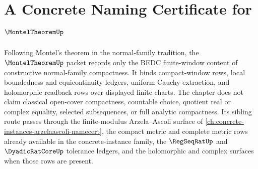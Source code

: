 \chapter{A Concrete Naming Certificate for $\MontelTheoremUp$}
\label{ch:concrete-instances-montel-theorem-namecert}

Following Montel's theorem in the normal-family tradition, the $\MontelTheoremUp$ packet records only the BEDC finite-window content of constructive normal-family compactness. It binds compact-window rows, local boundedness and equicontinuity ledgers, uniform Cauchy extraction, and holomorphic readback rows over displayed finite charts. The chapter does not claim classical open-cover compactness, countable choice, quotient real or complex equality, selected subsequences, or full analytic compactness. Its sibling route passes through the finite-modulus Arzela--Ascoli surface of \autoref{ch:concrete-instances-arzelaascoli-namecert}, the compact metric and complete metric rows already available in the concrete-instance family, the $\RegSeqRatUp$ and $\DyadicRatCoreUp$ tolerance ledgers, and the holomorphic and complex surfaces when those rows are present.

